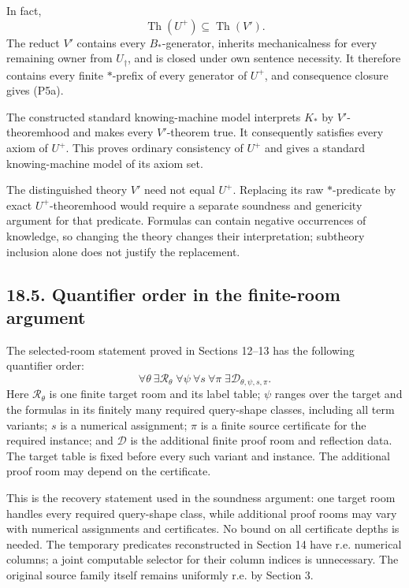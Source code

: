 \documentclass[
  11pt,
  letterpaper,
]{article}
\begin{document}
In fact, \[
\operatorname{Th}(U^+)\subseteq\operatorname{Th}(V').
\tag{P5a}
\] The reduct \(V'\) contains every \(B_*\)-generator, inherits
mechanicalness for every remaining owner from \(U_\dagger\), and is
closed under own sentence necessity. It therefore contains every finite
\(*\)-prefix of every generator of \(U^+\), and consequence closure
gives (P5a).

The constructed standard knowing-machine model interprets \(K_*\) by
\(V'\)-theoremhood and makes every \(V'\)-theorem true. It consequently
satisfies every axiom of \(U^+\). This proves ordinary consistency of
\(U^+\) and gives a standard knowing-machine model of its axiom set.

The distinguished theory \(V'\) need not equal \(U^+\). Replacing its
raw \(*\)-predicate by exact \(U^+\)-theoremhood would require a
separate soundness and genericity argument for that predicate. Formulas
can contain negative occurrences of knowledge, so changing the theory
changes their interpretation; subtheory inclusion alone does not justify
the replacement.

\subsection{18.5. Quantifier order in the finite-room
argument}\label{quantifier-order-in-the-finite-room-argument}

The selected-room statement proved in Sections 12--13 has the following
quantifier order: \[
\forall\theta\ \exists\mathscr R_\theta\;
\forall\psi\ \forall s\ \forall\pi\;
\exists\mathscr D_{\theta,\psi,s,\pi}.
\tag{P6}
\] Here \(\mathscr R_\theta\) is one finite target room and its label
table; \(\psi\) ranges over the target and the formulas in its finitely
many required query-shape classes, including all term variants; \(s\) is
a numerical assignment; \(\pi\) is a finite source certificate for the
required instance; and \(\mathscr D\) is the additional finite proof
room and reflection data. The target table is fixed before every such
variant and instance. The additional proof room may depend on the
certificate.

This is the recovery statement used in the soundness argument: one
target room handles every required query-shape class, while additional
proof rooms may vary with numerical assignments and certificates. No
bound on all certificate depths is needed. The temporary predicates
reconstructed in Section 14 have r.e. numerical columns; a joint
computable selector for their column indices is unnecessary. The
original source family itself remains uniformly r.e. by Section 3.
\end{document}
